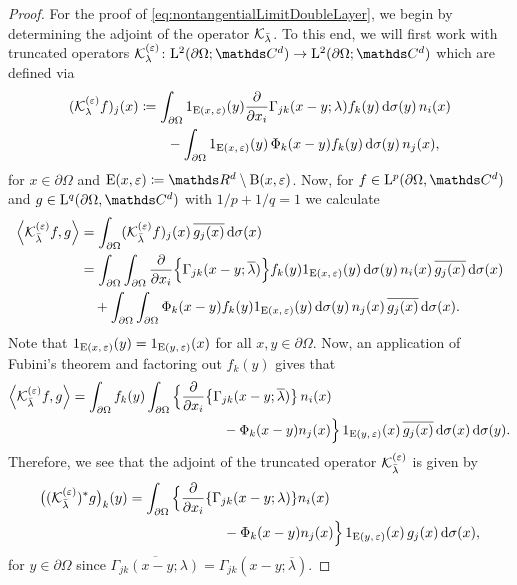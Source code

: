 \begin{proof}
  For the proof of \eqref{eq:nontangentialLimitDoubleLayer}, we begin by determining the adjoint of the operator $\mathcal{K}_{\bar\lambda}$.
  To this end, we will first work with truncated operators $\K_{\lambda}^{(\varepsilon)} \colon \Ell^2(\partial\Omega; \C^d) \to \Ell^2(\partial\Omega; \C^d)$ which are defined via
  \begin{align*}
    (\mathcal{K}_\lambda^{(\varepsilon)} f)_j (x)
    &\coloneqq \int_{\partial\Omega} 1_{\mathrm{E}(x, \,\varepsilon)}(y) \frac{\partial}{\partial x_i} \Gamma_{jk}(x - y; \lambda)  f_k(y) \, {\operatorname{d}\!{\sigma}}(y) \, n_i(x) \\
    &\qquad - \int_{\partial\Omega} 1_{\mathrm{E}(x, \,\varepsilon)}(y)\, \Phi_k(x - y) f_k(y) \, {\operatorname{d}\!{\sigma}}(y) \, n_j(x),
  \end{align*}
  for $x \in \partial\Omega$ and $\EE(x,\varepsilon) \coloneqq \R^d \setminus \BB(x, \varepsilon)$.
  Now, for $f \in \Ell^p(\partial\Omega, \C^d)$ and $g \in \Ell^q(\partial\Omega, \C^d)$ with $1/p + 1/q = 1$ we calculate
  \begin{align*}
    \Big\langle \mathcal{K}_{\bar\lambda}^{(\varepsilon)}f, g \Big\rangle
    &= \int_{\partial\Omega} (\mathcal{K}_{\bar\lambda}^{(\varepsilon)} f)_j(x) \, \overline{g_j(x)} \, {\operatorname{d}\!{\sigma}}(x) \\
    &= \int_{\partial\Omega} \int_{\partial\Omega} \frac{\partial}{\partial x_i} \Big\{ \Gamma_{jk} (x - y; \overline\lambda) \Big\} f_k(y) 1_{\mathrm{E}(x, \,\varepsilon)}(y) \, {\operatorname{d}\!{\sigma}}(y) \, n_i(x) \, \overline{g_j(x)} \, {\operatorname{d}\!{\sigma}}(x) \\
    &\quad+ \int_{\partial\Omega} \int_{\partial\Omega} \Phi_k(x -y)f_k(y) 1_{\mathrm{E}(x,\, \varepsilon)}(y) \, {\operatorname{d}\!{\sigma}}(y) \, n_j(x) \, \overline{g_j(x)} \, {\operatorname{d}\!{\sigma}}(x).
  \end{align*}
  Note that $1_{\mathrm{E}(x,\, \varepsilon)}(y) = 1_{\mathrm{E}(y,\, \varepsilon)}(x)$ for all $x, y \in \partial\Omega$.
  Now, an application of Fubini's theorem and factoring out $f_k(y)$ gives that 
  \begin{align*}
    \Big\langle \mathcal{K}_{\bar\lambda}^{(\varepsilon)}f, g \Big\rangle 
    =
    \int_{\partial\Omega} f_k(y) \int_{\partial\Omega} \Big\{ & \frac{\partial}{\partial x_i} \big\{  \Gamma_{jk}(x - y; \overline\lambda)\big\}\, n_i(x) \\
    &\qquad \quad - \Phi_k(x - y)  n_j(x) \Big\}\, 1_{\mathrm{E}(y,\, \varepsilon)}(x)\, \overline{g_j(x)} \, {\operatorname{d}\!{\sigma}}(x) \, {\operatorname{d}\!{\sigma}}(y).
  \end{align*}
  Therefore, we see that the adjoint of the truncated operator $\mathcal{K}_{\bar\lambda}^{(\varepsilon)}$ is given by
  \begin{align*}
    \big( ( \mathcal{K}_{\bar\lambda}^{(\varepsilon)})^* g\big)_k(y)
    = \int_{\partial\Omega} \Big\{ &\frac{\partial}{\partial x_i} \{ \Gamma_{jk}(x - y; \lambda)\} n_i(x) \\
    &\qquad\quad - \Phi_k(x - y) n_j(x)\Big\}\, 1_{\mathrm{E}(y,\,\varepsilon)}(x) \, g_j(x) \, {\operatorname{d}\!{\sigma}}(x), 
  \end{align*}
  for $y \in \partial\Omega$ since $\overline{\Gamma_{jk}(x - y; \lambda)} = \Gamma_{jk}(x - y; \overline\lambda)$.


\end{proof}
